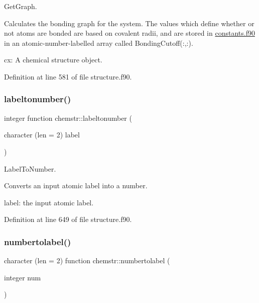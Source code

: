 Get\+Graph. 

Calculates the bonding graph for the system. The values which define whether or not atoms are bonded are based on covalent radii, and are stored in \mbox{\hyperlink{constants_8f90_source}{constants.\+f90}} in an atomic-\/number-\/labelled array called Bonding\+Cutoff(\+:,\+:).


\begin{DoxyItemize}
\item cx\+: A chemical structure object. 
\end{DoxyItemize}

Definition at line 581 of file structure.\+f90.

\mbox{\label{namespacechemstr_a7f2ae90cc1ce50d3b46f045b46147e23}} 
\subsubsection{\texorpdfstring{labeltonumber()}{labeltonumber()}}
{\footnotesize\ttfamily integer function chemstr\+::labeltonumber (\begin{DoxyParamCaption}\item[{character (len = 2)}]{label }\end{DoxyParamCaption})}



Label\+To\+Number. 

Converts an input atomic label into a number.


\begin{DoxyItemize}
\item label\+: the input atomic label. 
\end{DoxyItemize}

Definition at line 649 of file structure.\+f90.

\mbox{\label{namespacechemstr_aa1abd301519206cbfe3d966c11a9b73b}} 
\subsubsection{\texorpdfstring{numbertolabel()}{numbertolabel()}}
{\footnotesize\ttfamily character (len = 2) function chemstr\+::numbertolabel (\begin{DoxyParamCaption}\item[{integer}]{num }\end{DoxyParamCaption})}



